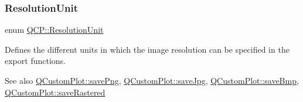 \mbox{\label{namespace_q_c_p_a715d46153da230990aa887d0f0602452}} 
\subsubsection{\texorpdfstring{Resolution\+Unit}{ResolutionUnit}\hspace{0.1cm}{\footnotesize\ttfamily [2/2]}}
{\footnotesize\ttfamily enum \hyperlink{namespace_q_c_p_a715d46153da230990aa887d0f0602452}{Q\+C\+P\+::\+Resolution\+Unit}}

Defines the different units in which the image resolution can be specified in the export functions.

\begin{DoxySeeAlso}{See also}
\hyperlink{class_q_custom_plot_ac92cc9256d12f354b40a4be4600b5fb9}{Q\+Custom\+Plot\+::save\+Png}, \hyperlink{class_q_custom_plot_a76f0d278e630a711fa6f48048cfd83e4}{Q\+Custom\+Plot\+::save\+Jpg}, \hyperlink{class_q_custom_plot_ae3a86ed0795670e50afa21759d4fa13d}{Q\+Custom\+Plot\+::save\+Bmp}, \hyperlink{class_q_custom_plot_ad7723ce2edfa270632ef42b03a444352}{Q\+Custom\+Plot\+::save\+Rastered} 
\end{DoxySeeAlso}

